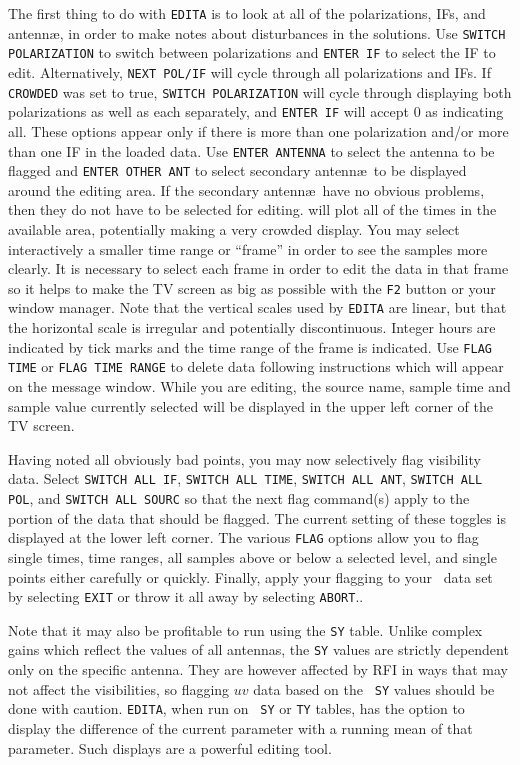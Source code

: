 The first thing to do with {\tt EDITA} is to look at all of the
polarizations, IFs, and antenn\ae, in order to make notes about
disturbances in the solutions.  Use {\tt SWITCH POLARIZATION} to
switch between polarizations and {\tt ENTER IF} to select the IF to
edit.  Alternatively, {\tt NEXT POL/IF} will cycle through all
polarizations and IFs.  If {\tt CROWDED} was set to true, {\tt SWITCH
POLARIZATION} will cycle through displaying both polarizations as well
as each separately, and {\tt ENTER IF} will accept 0 as indicating
all.  These options appear only if there is more than one polarization
and/or more than one IF in the loaded data.  Use {\tt ENTER ANTENNA}
to select the antenna to be flagged and {\tt ENTER OTHER ANT} to
select secondary antenn\ae\ to be displayed around the editing area.
If the secondary antenn\ae\ have no obvious problems, then they do not
have to be selected for editing.  {\tt {}} will plot all of
the times in the available area, potentially making a very crowded
display.  You may select interactively a smaller time range or
``frame'' in order to see the samples more clearly.  It is necessary
to select each frame in order to edit the data in that frame so it
helps to make the TV screen as big as possible with the {\tt F2}
button or your window manager.  Note that the vertical scales used by
{\tt EDITA} are linear, but that the horizontal scale is irregular and
potentially discontinuous.  Integer hours are indicated by tick marks
and the time range of the frame is indicated.  Use {\tt FLAG TIME} or
{\tt FLAG TIME RANGE} to delete data following instructions which will
appear on the message window.  While you are editing, the source name,
sample time and sample value currently selected will be displayed in
the upper left corner of the TV screen.

Having noted all obviously bad points, you may now selectively flag
visibility data.  Select {\tt SWITCH ALL IF}, {\tt SWITCH ALL TIME},
{\tt SWITCH ALL ANT}, {\tt SWITCH ALL POL}, and {\tt SWITCH ALL SOURC}
so that the next flag command(s) apply to the portion of the data that
should be flagged.  The current setting of these toggles is displayed
at the lower left corner.  The various {\tt FLAG} options allow you to
flag single times, time ranges, all samples above or below a selected
level, and single points either carefully or quickly.  Finally, apply
your flagging to your \uv\ data set by selecting {\tt EXIT} or throw it
all away by selecting {\tt ABORT}\@..

Note that it may also be profitable to run {\tt {}} using
the {\tt SY} table.  Unlike complex gains which reflect the values of
all antennas, the {\tt SY} values are strictly dependent only on the
specific antenna.  They are however affected by RFI in ways that may
not affect the visibilities, so flagging $uv$ data based on the {\tt
SY} values should be done with caution.  {\tt EDITA}, when run on {\tt
SY} or {\tt TY} tables, has the option to display the difference of
the current parameter with a running mean of that parameter.  Such
displays are a powerful editing tool.


